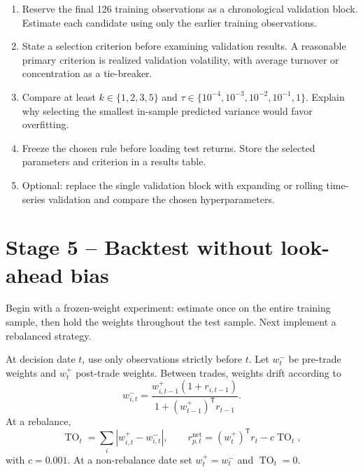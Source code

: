 \documentclass[10pt]{article}
\newcommand{\trans}{^{\mathsf T}}
\begin{document}
\begin{enumerate}[label=\textbf{4.\arabic*.}]
\item Reserve the final 126 training observations as a chronological validation
block. Estimate each candidate using only the earlier training observations.
\item State a selection criterion before examining validation results. A
reasonable primary criterion is realized validation volatility, with average
turnover or concentration as a tie-breaker.
\item Compare at least $k\in\{1,2,3,5\}$ and
$\tau\in\{10^{-4},10^{-3},10^{-2},10^{-1},1\}$. Explain why selecting the
smallest in-sample predicted variance would favor overfitting.
\item Freeze the chosen rule before loading test returns. Store the selected
parameters and criterion in a results table.
\item Optional: replace the single validation block with expanding or rolling
time-series validation and compare the chosen hyperparameters.
\end{enumerate}

\section{Stage 5 -- Backtest without look-ahead bias}

Begin with a frozen-weight experiment: estimate once on the entire training
sample, then hold the weights throughout the test sample. Next implement a
rebalanced strategy.

At decision date $t$, use only observations strictly before $t$. Let $w_t^-$
be pre-trade weights and $w_t^+$ post-trade weights. Between trades, weights
drift according to
\[
w_{i,t}^-=
\frac{w_{i,t-1}^+(1+r_{i,t-1})}
{1+(w_{t-1}^+)\trans r_{t-1}}.
\]
At a rebalance,
\[
\operatorname{TO}_t=\sum_i|w_{i,t}^+-w_{i,t}^-|,
\qquad
r_{p,t}^{\mathrm{net}}=(w_t^+)\trans r_t-c\operatorname{TO}_t,
\]
with $c=0.001$. At a non-rebalance date set $w_t^+=w_t^-$ and
$\operatorname{TO}_t=0$.
\end{document}
